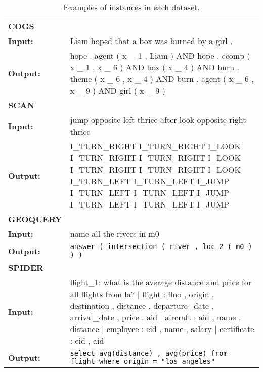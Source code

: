 \begin{table*}[]
\centering
\begin{adjustbox}{max width=\textwidth}
\begin{tabular}{p{7em}p{}}
\toprule
\textbf{COGS} \\
\textbf{Input: } & Liam hoped that a box was burned by a girl . \\
\textbf{Output: } & hope . agent ( x \_ 1 , Liam ) AND hope . ccomp ( x \_ 1 , x \_ 6 ) AND box ( x \_ 4 ) AND burn . theme ( x \_ 6 , x \_ 4 ) AND burn . agent ( x \_ 6 , x \_ 9 ) AND girl ( x \_ 9 ) \\
\midrule
\textbf{SCAN} \\
\textbf{Input:} & jump opposite left thrice after look opposite right thrice
\\
\textbf{Output:} & I\_TURN\_RIGHT I\_TURN\_RIGHT I\_LOOK I\_TURN\_RIGHT I\_TURN\_RIGHT I\_LOOK I\_TURN\_RIGHT I\_TURN\_RIGHT I\_LOOK I\_TURN\_LEFT I\_TURN\_LEFT I\_JUMP I\_TURN\_LEFT I\_TURN\_LEFT I\_JUMP I\_TURN\_LEFT I\_TURN\_LEFT I\_JUMP
\\
\midrule
\textbf{GEOQUERY} \\
\textbf{Input:} & name all the rivers in m0 \\
\textbf{Output:} & \texttt{answer ( intersection ( river , loc\_2 ( m0 ) ) )} \\
\midrule
\textbf{SPIDER} \\
\textbf{Input: } & flight\_1: what is the average distance and price for all flights from la? | flight : flno , origin , destination , distance , departure\_date , arrival\_date , price , aid | aircraft : aid , name , distance | employee : eid , name , salary | certificate : eid , aid	 \\
\textbf{Output: } & \texttt{select avg(distance) , avg(price) from flight where origin = "los angeles"}
\\
\bottomrule
\end{tabular}
\end{adjustbox}
\caption{Examples of instances in each dataset.}
\label{tab:instanceexample}

\end{table*}
